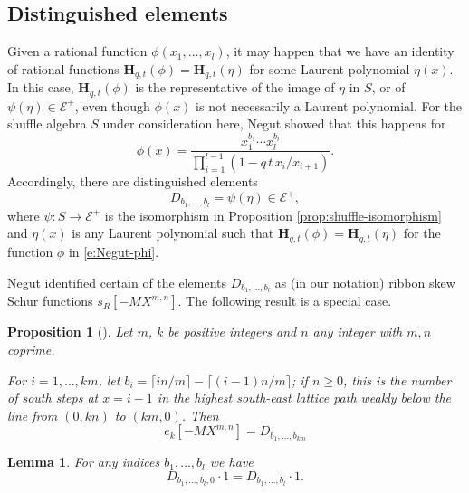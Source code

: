 \documentclass[12pt]{amsart}
\newtheorem{lemma}[thm]{Lemma}
\newtheorem{prop}[thm]{Proposition}
\theoremstyle{definition}
\theoremstyle{remark}
\newcommand{\Hbold}{{\mathbf H}}
\newcommand{\Ecal}{{\mathcal E}}
\begin{document}
\subsection{Distinguished elements}
\label{ss:Negut-elements}

Given a rational function $\phi (x_{1},\ldots,x_{l})$, it may happen
that we have an identity of rational functions $\Hbold _{q,t}(\phi ) =
\Hbold _{q,t}(\eta )$ for some Laurent polynomial $\eta (x)$.  In this
case, $\Hbold _{q,t}(\phi )$ is the representative of the image of
$\eta$ in $S$, or of $\psi (\eta )\in \Ecal ^{+}$, even though $\phi
(x)$ is not necessarily a Laurent polynomial.  For the shuffle algebra
$S$ under consideration here, Negut \cite[Proposition 6.1]{Negut14}
showed that this happens for
\begin{equation}\label{e:Negut-phi}
\phi (x) = \frac{x_{1}^{b_{1}}\cdots x_{l}^{b_{l}}}{\prod
_{i=1}^{l-1}(1-q\, t\, x_{i}/x_{i+1})}.
\end{equation}
Accordingly, there are distinguished elements
\begin{equation}\label{e:Negut-element}
D_{b_{1},\ldots,b_{l}} = \psi (\eta )\in \Ecal ^{+},
\end{equation}
where $\psi \colon S \rightarrow \Ecal ^{+}$ is the isomorphism in
Proposition \ref{prop:shuffle-isomorphism} and $\eta (x)$ is any
Laurent polynomial such that $\Hbold _{q,t}(\phi) = \Hbold _{q,t}(\eta
)$ for the function $\phi $ in \eqref{e:Negut-phi}.

Negut identified certain of the elements $D_{b_{1},\ldots,b_{l}}$ as
(in our notation) ribbon skew Schur functions $s_{R}[-MX^{m,n}]$.  The
following result is a special case.

\begin{prop}[{\cite[Proposition 6.7]{Negut14}}] \label{prop:ek-vs-Db}
Let $m$, $k$
be positive integers and $n$ any integer with $m,n$ coprime.

For $i=1,\ldots,km$, let $b_{i} = \lceil i n/m \rceil -\lceil (i-1) n/m
\rceil $; if $n \geq 0$, this is
the number of south steps at $x=i-1$ in the highest
south-east lattice path weakly below the line from $(0,kn)$ to
$(km,0)$.  Then
\begin{equation}\label{e:ek-vs-Db}
e_{k}[-M X^{m,n}] = D_{b_{1},\ldots,b_{km}}
\end{equation}
\end{prop}

\begin{lemma}\label{lem:trailing-zero}
For any indices $b_{1},\ldots,b_{l}$ we have
\begin{equation}\label{e:trailing-zero}
D_{b_{1},\ldots,b_{l},0} \cdot 1 = D_{b_{1},\ldots,b_{l}} \cdot 1.
\end{equation}
\end{lemma}
\end{document}
